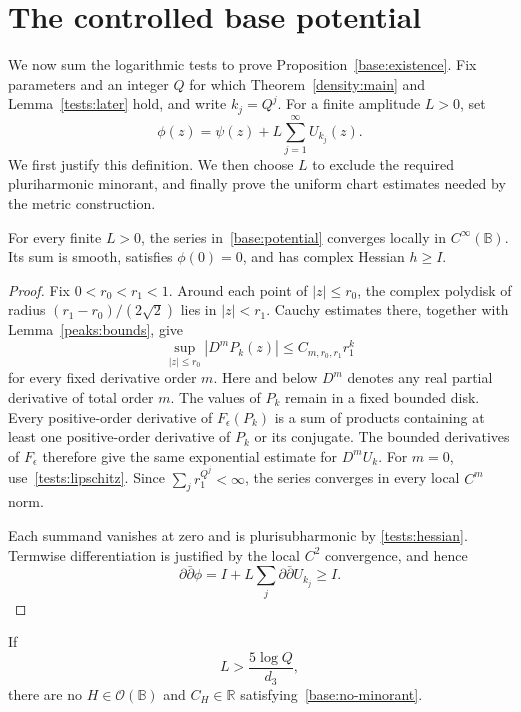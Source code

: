 \section{The controlled base potential}\label{sec:base-potential}

We now sum the logarithmic tests to prove
Proposition~\ref{base:existence}.  Fix parameters and an integer $Q$
for which Theorem~\ref{density:main} and Lemma~\ref{tests:later}
hold, and write $k_j=Q^j$.  For a finite amplitude $L>0$, set
\begin{equation}\label{base:potential}
 \phi(z)=\psi(z)+L\sum_{j=1}^\infty U_{k_j}(z).
\end{equation}
We first justify this definition.  We then choose $L$ to exclude
the required pluriharmonic minorant, and finally prove the uniform
chart estimates needed by the metric construction.

\begin{lemma}\label{base:convergence}
For every finite $L>0$, the series in~\eqref{base:potential}
converges locally in $C^\infty(\mathbb B)$.  Its sum is smooth,
satisfies $\phi(0)=0$, and has complex Hessian $h\ge I$.
\end{lemma}

\begin{proof}
Fix $0<r_0<r_1<1$.  Around each point of $|z|\le r_0$, the complex
polydisk of radius $(r_1-r_0)/(2\sqrt2)$ lies in $|z|<r_1$.
Cauchy estimates there, together with Lemma~\ref{peaks:bounds}, give
\[
 \sup_{|z|\le r_0}|D^mP_k(z)|
 \le C_{m,r_0,r_1}r_1^k
\]
for every fixed derivative order $m$.  Here and below $D^m$ denotes
any real partial derivative of total order $m$.
The values of $P_k$ remain in a fixed bounded disk.
Every positive-order derivative of $F_\epsilon(P_k)$ is a sum of
products containing at least one positive-order derivative of
$P_k$ or its conjugate.  The bounded derivatives of $F_\epsilon$
therefore give the same exponential estimate for $D^mU_k$.
For $m=0$, use~\eqref{tests:lipschitz}.
Since $\sum_j r_1^{Q^j}<\infty$, the series converges in every local
$C^m$ norm.

Each summand vanishes at zero and is plurisubharmonic by
\eqref{tests:hessian}.  Termwise differentiation is justified by
the local $C^2$ convergence, and hence
\[
 \partial\bar\partial\phi
 =I+L\sum_j\partial\bar\partial U_{k_j}\ge I.
\]
\end{proof}

\begin{lemma}\label{base:minorant}
If
\begin{equation}\label{base:amplitude}
 L>\frac{5\log Q}{d_3},
\end{equation}
there are no $H\in\mathcal O(\mathbb B)$ and $C_H\in\mathbb R$
satisfying~\eqref{base:no-minorant}.
\end{lemma}

